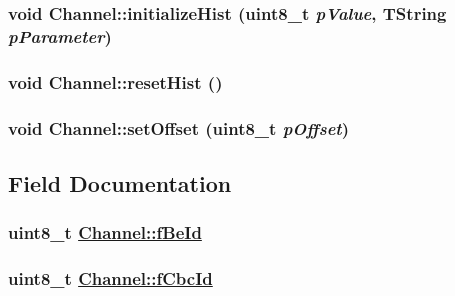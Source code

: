 \hypertarget{struct_channel_4bb2e116319e8c5122c821e82a56cb89}{
\subsubsection[initializeHist]{\setlength{\rightskip}{0pt plus 5cm}void Channel::initialize\-Hist (uint8\_\-t {\em p\-Value}, TString {\em p\-Parameter})}}
\label{struct_channel_4bb2e116319e8c5122c821e82a56cb89}


\hypertarget{struct_channel_e97d073ff9a992d141eb8350f6c504ff}{
\subsubsection[resetHist]{\setlength{\rightskip}{0pt plus 5cm}void Channel::reset\-Hist ()}}
\label{struct_channel_e97d073ff9a992d141eb8350f6c504ff}


\hypertarget{struct_channel_a88adf1f3058e04b8763ffffe6e9b1d8}{
\subsubsection[setOffset]{\setlength{\rightskip}{0pt plus 5cm}void Channel::set\-Offset (uint8\_\-t {\em p\-Offset})}}
\label{struct_channel_a88adf1f3058e04b8763ffffe6e9b1d8}




\subsection{Field Documentation}
\hypertarget{struct_channel_8b456db0ac7206afd7062c7fc6ea1015}{
\subsubsection[fBeId]{\setlength{\rightskip}{0pt plus 5cm}uint8\_\-t \hyperlink{struct_channel_8b456db0ac7206afd7062c7fc6ea1015}{Channel::f\-Be\-Id}}}
\label{struct_channel_8b456db0ac7206afd7062c7fc6ea1015}


\hypertarget{struct_channel_434b0806f9c242aa903f8be8e5849d7b}{
\subsubsection[fCbcId]{\setlength{\rightskip}{0pt plus 5cm}uint8\_\-t \hyperlink{struct_channel_434b0806f9c242aa903f8be8e5849d7b}{Channel::f\-Cbc\-Id}}}
\label{struct_channel_434b0806f9c242aa903f8be8e5849d7b}


